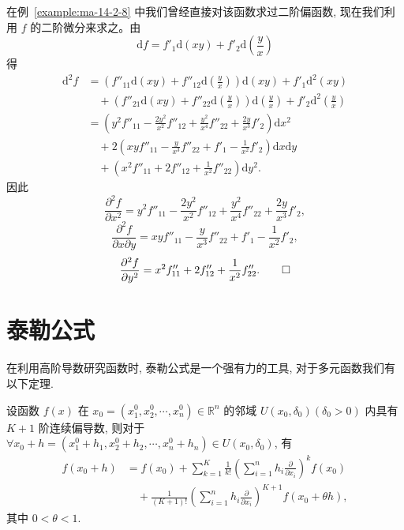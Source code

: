 \begin{solve}
在例~\ref{example:ma-14-2-8} 中我们曾经直接对该函数求过二阶偏函数, 现在我们利用 $f$ 的二阶微分来求之。由
\[
  \mathrm df=f'_1\mathrm d(xy)+f'_2\mathrm d\left(\frac yx\right)
\]
得
\[
\begin{aligned}
  \mathrm d^2f
  &=\left(f''_{11}\mathrm d(xy)+f''_{12}\mathrm d\left(\frac yx\right)\right)\mathrm d(xy)
  +f'_1\mathrm d^2(xy)\\
  &\quad+\left(f''_{21}\mathrm d(xy)+f''_{22}\mathrm d\left(\frac yx\right)\right)
  \mathrm d\left(\frac yx\right)+f'_2\mathrm d^2\left(\frac yx\right)\\
  &=\left(y^2f''_{11}-\frac{2y^2}{x^2}f''_{12}
  +\frac{y^2}{x^4}f''_{22}+\frac{2y}{x^3}f'_2\right)\mathrm dx^2\\
  &\quad+2\left(xyf''_{11}-\frac y{x^3}f''_{22}
  +f'_1-\frac1{x^2}f'_2\right)\mathrm dx\mathrm dy\\
  &\quad+\left(x^2f''_{11}+2f''_{12}+\frac1{x^2}f''_{22}\right)\mathrm dy^2.
\end{aligned}
\]
因此
\[
  \frac{\partial^2 f}{\partial x^2}
  =y^2f''_{11}-\frac{2y^2}{x^2}f''_{12}
  +\frac{y^2}{x^4}f''_{22}+\frac{2y}{x^3}f'_2,
\]
\[
  \frac{\partial^2 f}{\partial x\partial y}
  =xyf''_{11}-\frac y{x^3}f''_{22}
  +f'_1-\frac1{x^2}f'_2,
\]
\[
  \frac{\partial^2 f}{\partial y^2}
  =x^2f''_{11}+2f''_{12}+\frac1{x^2}f''_{22}.
\qedhere
\]
\end{solve}


\section{泰勒公式}
\label{sec:ma-14-3}

在利用高阶导数研究函数时, 泰勒公式是一个强有力的工具, 对于多元函数我们有以下定理.

\begin{theorem}[{泰勒公式}]\label{theorem:ma-14-3-1}
设函数 $f(x)$ 在 $x_0=(x_1^0,x_2^0,\cdots,x_n^0)\in\mathbb R^n$ 的邻域 $U(x_0,\delta_0)(\delta_0>0)$ 内具有 $K+1$ 阶连续偏导数, 则对于 $\forall x_0+h=(x_1^0+h_1,x_2^0+h_2,\cdots,x_n^0+h_n)\in U(x_0,\delta_0)$, 有
\begin{equation}
\begin{aligned}
  f(x_0+h)
  &=f(x_0)+\sum_{k=1}^K\frac1{k!}
  \left(\sum_{i=1}^n h_i\frac{\partial}{\partial x_i}\right)^k f(x_0)\\
  &\quad+\frac1{(K+1)!}
  \left(\sum_{i=1}^n h_i\frac{\partial}{\partial x_i}\right)^{K+1}
  f(x_0+\theta h),
\end{aligned}
\label{eq:ma-14-3-1}
\end{equation}
其中 $0<\theta<1$.
\end{theorem}


